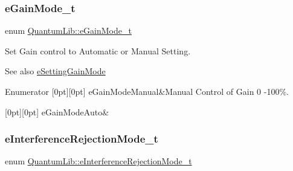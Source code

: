 \subsubsection{\texorpdfstring{e\+Gain\+Mode\+\_\+t}{eGainMode\_t}}
{\footnotesize\ttfamily enum \mbox{\hyperlink{namespace_quantum_lib_a20b6e658baa33fde788739a47dab2e13}{Quantum\+Lib\+::e\+Gain\+Mode\+\_\+t}}}

Set Gain control to Automatic or Manual Setting. \begin{DoxySeeAlso}{See also}
\mbox{\hyperlink{namespace_quantum_lib_acc8124e3e65bca4aa798d03a55e3d54cac2b7c0f09c75a3de9a2780d3bae0296f}{e\+Setting\+Gain\+Mode}} 
\end{DoxySeeAlso}
\begin{DoxyEnumFields}{Enumerator}
[0pt][0pt]{}\mbox{\label{namespace_quantum_lib_a20b6e658baa33fde788739a47dab2e13a9524dcce29cd5dafe4ff72a82fed92c0}} 
e\+Gain\+Mode\+Manual&Manual Control of Gain 0 -\/100\%. \\
\hline

[0pt][0pt]{}\mbox{\label{namespace_quantum_lib_a20b6e658baa33fde788739a47dab2e13a34ca56b0fd5855b109089ebaaccfe50a}} 
e\+Gain\+Mode\+Auto&\\
\hline

\end{DoxyEnumFields}
\mbox{\label{namespace_quantum_lib_a7dffda270c051259ba5338455f89b350}} 
\subsubsection{\texorpdfstring{e\+Interference\+Rejection\+Mode\+\_\+t}{eInterferenceRejectionMode\_t}}
{\footnotesize\ttfamily enum \mbox{\hyperlink{namespace_quantum_lib_a7dffda270c051259ba5338455f89b350}{Quantum\+Lib\+::e\+Interference\+Rejection\+Mode\+\_\+t}}}

